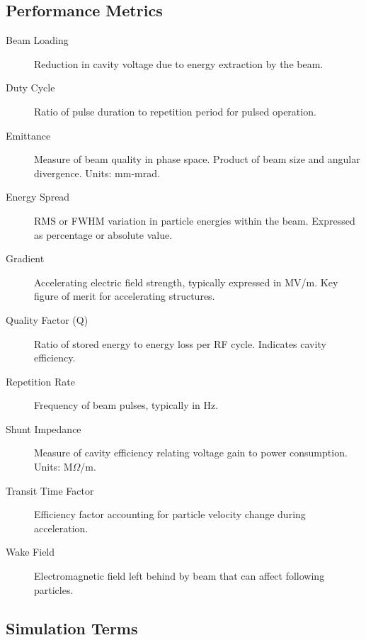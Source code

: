 \subsection{Performance Metrics}

\begin{description}
\item[Beam Loading] Reduction in cavity voltage due to energy extraction by the beam.

\item[Duty Cycle] Ratio of pulse duration to repetition period for pulsed operation.

\item[Emittance] Measure of beam quality in phase space. Product of beam size and angular divergence. Units: mm-mrad.

\item[Energy Spread] RMS or FWHM variation in particle energies within the beam. Expressed as percentage or absolute value.

\item[Gradient] Accelerating electric field strength, typically expressed in MV/m. Key figure of merit for accelerating structures.

\item[Quality Factor (Q)] Ratio of stored energy to energy loss per RF cycle. Indicates cavity efficiency.

\item[Repetition Rate] Frequency of beam pulses, typically in Hz.

\item[Shunt Impedance] Measure of cavity efficiency relating voltage gain to power consumption. Units: M$\Omega$/m.

\item[Transit Time Factor] Efficiency factor accounting for particle velocity change during acceleration.

\item[Wake Field] Electromagnetic field left behind by beam that can affect following particles.
\end{description}

\subsection{Simulation Terms}

